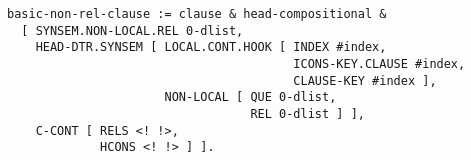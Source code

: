 \documentclass[a4paper]{article}
\begin{document}
{\small\begin{verbatim}
basic-non-rel-clause := clause & head-compositional & 
  [ SYNSEM.NON-LOCAL.REL 0-dlist,
    HEAD-DTR.SYNSEM [ LOCAL.CONT.HOOK [ INDEX #index,
                                        ICONS-KEY.CLAUSE #index,
                                        CLAUSE-KEY #index ],
                      NON-LOCAL [ QUE 0-dlist,
                                  REL 0-dlist ] ],
    C-CONT [ RELS <! !>,
             HCONS <! !> ] ].
\end{verbatim}}
\end{document}
